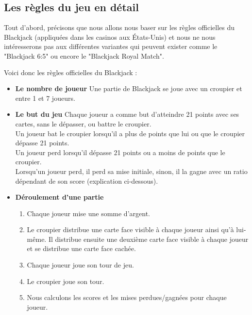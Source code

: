 \subsection{Les règles du jeu en détail}

Tout d'abord, précisons que nous allons nous baser sur les règles officielles du Blackjack (appliquées dans les casinos aux États-Unis) et nous ne nous intéresserons pas aux différentes variantes qui peuvent exister comme le "Blackjack 6:5" ou encore le "Blackjack Royal Match".

\bigskip

Voici donc les règles officielles du Blackjack :

\begin{itemize}
    \item \textbf{Le nombre de joueur} \newline
    Une partie de Blackjack se joue avec un croupier et entre 1 et 7 joueurs.

    \item \textbf{Le but du jeu} \newline
    Chaque joueur a comme but d'atteindre 21 points avec ses cartes, sans le dépasser, ou battre le croupier.\\
    Un joueur bat le croupier lorsqu'il a plus de points que lui ou que le croupier dépasse 21 points.\\
    Un joueur perd lorsqu'il dépasse 21 points ou a moins de points que le croupier.\\
    Lorsqu'un joueur perd, il perd sa mise initiale, sinon, il la gagne avec un ratio dépendant de son score (explication ci-dessous).

    \item \textbf{Déroulement d'une partie}
    \begin{enumerate}
        \item Chaque joueur mise une somme d'argent.
        \item Le croupier distribue une carte face visible à chaque joueur ainsi qu'à lui-même. Il distribue ensuite une deuxième carte face visible à chaque joueur et se distribue une carte face cachée.
        \item Chaque joueur joue son tour de jeu.
        \item Le croupier joue son tour.
        \item Nous calculons les scores et les mises perdues/gagnées pour chaque joueur.
    \end{enumerate}
    

\end{itemize}
